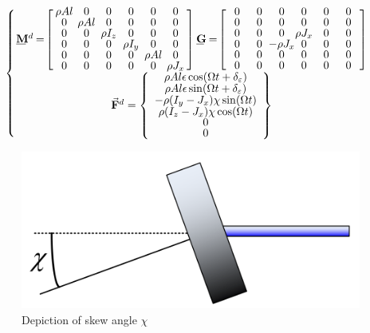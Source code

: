 \begin{equation}\label{eq:DiskNodeEquations}
\def\cs{3em}
\left\{
\begin{array}{@{}c}
\arraycolsep=1pt\begin{array}{rlrl}
\bunderline{\mathbf{M}}^d & =\!\left[\def\arraystretch{.8}\arraycolsep=-.5em\begin{array}{cccccc}
\makebox[\cs]{$\rho Al$}&\makebox[\cs]{0}&\makebox[\cs]{0}&\makebox[\cs]{0}&\makebox[\cs]{0}&\makebox[\cs]{0}\\
0&\rho Al&0&0&0&0\\
0&0&\rho I_{z}&0&0&0\\
0&0&0&\rho I_{y}&0&0\\
0&0&0&0&\rho Al&0\\
0&0&0&0&0&\rho J_x
\end{array}\right] & \bunderline{\mathbf{G}} & = \!\left[\def\arraystretch{.8}\arraycolsep=-.5em\begin{array}{cccccc}
\makebox[\cs]{0}&\makebox[\cs]{0}&\makebox[\cs]{0}&\makebox[\cs]{0}&\makebox[\cs]{0}&\makebox[\cs]{0}\\
0&0&0&0&0&0\\
0&0&0&\rho J_x&0&0\\
0&0&-\rho J_x&0&0&0\\
0&0&0&0&0&0\\
0&0&0&0&0&0
\end{array}\right]\\
\end{array}\\
\\[-1em]
\vec{\mathbf{F}}^d=\left\{\def\arraystretch{.8}\begin{array}{c}
\rho Al\epsilon\cos(\Omega t + \delta_\varepsilon)\\
\rho Al\epsilon\sin(\Omega t + \delta_\varepsilon)\\
-\rho( I_y-J_x)\chi\sin(\Omega t)\\
\rho( I_z-J_x)\chi\cos(\Omega t)\\
0\\
0
\end{array}\right\}
\end{array}\right.
\end{equation}
\begin{figure}
	\centering
	\includegraphics[width=.5\linewidth]{./figures/Images/Figure_1b}
	\caption{Depiction of skew angle $\chi$}
	\label{fig:ChiAngleDepiction}
	\centering
\end{figure}
